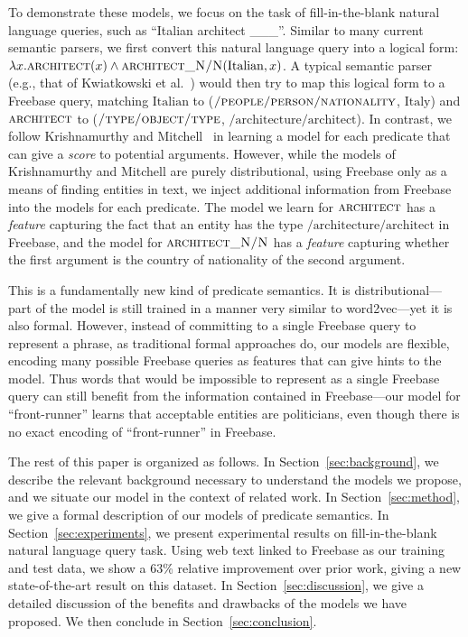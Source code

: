 \documentclass[11pt]{article}
\newcommand{\secref}[1]{Section~\ref{sec:#1}}
\newcommand{\blank}{\_\_\_}
\newcommand{\predicate}[1]{\ensuremath{\textsc{#1}}}
\newcommand{\entity}[1]{\ensuremath{\mathrm{#1}}}
\begin{document}
To demonstrate these models, we focus on the task of fill-in-the-blank natural
language queries, such as ``Italian architect \blank{}''.  Similar to many
current semantic parsers, we first convert this natural language query into a
logical form: $\lambda x. \predicate{architect}(x) \land
\predicate{architect\_N/N}(\entity{Italian}, x)$.  A typical semantic
parser (e.g., that of Kwiatkowski et
al.~) would then try to map this
logical form to a Freebase query, matching \entity{Italian} to
(\predicate{/people/person/nationality}, \entity{Italy}) and
\predicate{architect} to (\predicate{/type/object/type},
\entity{/architecture/architect}).  In contrast, we follow Krishnamurthy and
Mitchell~ in learning a
model for each predicate that can give a \emph{score} to potential arguments.
However, while the models of Krishnamurthy and Mitchell are purely
distributional, using Freebase only as a means of finding entities in text, we
inject additional information from Freebase into the models for each predicate.
The model we learn for \predicate{architect} has a \emph{feature} capturing the
fact that an entity has the type \entity{/architecture/architect} in Freebase,
and the model for \predicate{architect\_N/N} has a \emph{feature} capturing
whether the first argument is the country of nationality of the second
argument.

This is a fundamentally new kind of predicate semantics.  It is
distributional---part of the model is still trained in a manner very similar to
word2vec---yet it is also formal.  However, instead of committing to a single
Freebase query to represent a phrase, as traditional formal approaches do, our
models are flexible, encoding many possible Freebase queries as features that
can give hints to the model.  Thus words that would be impossible to represent
as a single Freebase query can still benefit from the information contained in
Freebase---our model for ``front-runner'' learns that acceptable entities are
politicians, even though there is no exact encoding of ``front-runner'' in
Freebase.

The rest of this paper is organized as follows.  In \secref{background}, we
describe the relevant background necessary to understand the models we propose,
and we situate our model in the context of related work.  In \secref{method},
we give a formal description of our models of predicate semantics.  In
\secref{experiments}, we present experimental results on fill-in-the-blank
natural language query task.  Using web text linked to Freebase as our training
and test data, we show a 63\% relative improvement over prior work, giving a
new state-of-the-art result on this dataset.  In \secref{discussion}, we give a
detailed discussion of the benefits and drawbacks of the models we have
proposed.  We then conclude in \secref{conclusion}.
\end{document}
